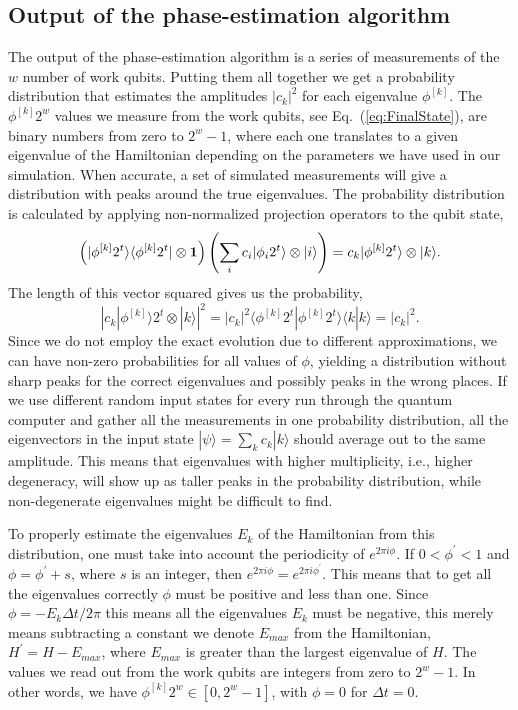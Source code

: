 \documentclass[aps,pra,twocolumn,floatfix]{revtex4}
\begin{document}
\subsection{Output of the phase-estimation algorithm}
\label{sec:output}
The output of the phase-estimation algorithm is a series of
measurements of the $w$ number of work qubits. Putting them all together
we get a
probability distribution that estimates the amplitudes $|c_k|^2$ for
each eigenvalue $\phi^{[k]}$.
The $\phi^{[k]}2^w$ 
values we measure from the work qubits, see Eq.~(\ref{eq:FinalState}),  
are  binary numbers from zero to $2^w-1$,
where each one translates to a given eigenvalue of the Hamiltonian depending
on the parameters we have used in our simulation. 
When accurate, a set of simulated
measurements will give a distribution with peaks around the true
eigenvalues. 
The probability
distribution is calculated by applying non-normalized projection
operators to the qubit state,
\[
	\left(| \phi^{[k]}2^t\rangle \langle\phi^{[k]}2^t | \otimes  {\bf 1} \right)
	\left( \sum_{i}c_i |\phi_i 2^t\rangle \otimes |i\rangle \right)
	= c_k|\phi^{[k]} 2^t\rangle \otimes |k\rangle.
\]
The length of this vector squared
gives us the probability,
\begin{equation}
	\left|c_k |\phi^{[k]}\rangle 2^t \otimes |k\rangle \right|^2=|c_k|^2 
	\langle \phi^{[k]} 2^t|\phi^{[k]} 2^t\rangle\langle k |k \rangle= |c_k|^2.
\end{equation} 
Since we do not employ the exact evolution due to different
approximations, we can have non-zero 
probabilities for all values of $\phi$, yielding a distribution
without sharp peaks for the correct eigenvalues and possibly peaks in
the wrong places. If we use different random input states for every
run through the quantum computer and gather
all the measurements in
one probability distribution, all the eigenvectors in the input state
$|\psi\rangle=\sum_k c_k | k\rangle$ should average out to the same amplitude.
This means that eigenvalues with higher multiplicity, i.e., higher
degeneracy, will show up as taller peaks in the probability distribution, 
while non-degenerate eigenvalues might be difficult to find.

To properly estimate the eigenvalues
$E_k$ of the Hamiltonian from this distribution, one must take into account the
periodicity of $e^{2\pi i\phi}$. If $0 < \phi^\prime < 1$ and $\phi =
\phi^\prime +s$, where $s$ is an integer, then
$e^{2\pi i\phi}=e^{2\pi i\phi^\prime}$. This means that to get all
the eigenvalues correctly $\phi$ must be positive and less than one.
Since $\phi = -E_k \Delta t/2\pi$ this means all the eigenvalues $E_k$
must be negative, this merely means subtracting a constant we denote 
$E_{max}$ from the Hamiltonian, $H^\prime = H -E_{max}$, where
$E_{max}$ is greater than the largest eigenvalue of $H$. 
The values we read out from the work qubits are integers from zero to
$2^w-1$. In other words, we have
$\phi^{[k]}2^w\in [0, 2^w-1]$, with $\phi=0$ for $\Delta t=0$. 
\end{document}
